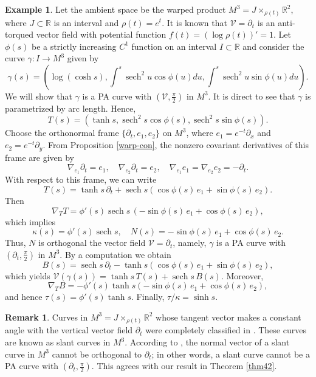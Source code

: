 \documentclass[12pt]{amsart}
\def\r{\mathbb R}
\def\v{\mathcal V}
\DeclareMathOperator{\sech}{sech}
\theoremstyle{definition}
\newtheorem{example}[theorem]{Example}
\newtheorem{remark}[theorem]{Remark}
\begin{document}
\begin{example}
Let the ambient space be the warped product $M^3=J\times_{\rho(t)}\r^2$, where $J\subset \r$ is an interval and $\rho(t)=e^t$. It is known that $\v=\partial_t$ is an anti-torqued vector field with potential function $f(t)=(\log \rho(t))'=1$. Let $\phi(s)$ be a strictly increasing $C^1$ function on an interval $I\subset \r$ and consider the curve $\gamma:I\to M^3$ given by
$$
\gamma(s)=\left ( \log (\cosh s), \int^s \sech^2 u\cos \phi(u) du, \int^s \sech^2 u\sin \phi(u) du\right ).
$$
We will show that $\gamma$ is a PA curve with $(\v,\frac{\pi}{2})$ in $M^3$. It is direct to see that $\gamma$ is parametrized by arc length. Hence,
$$
T(s)=\left ( \tanh s, \sech^2 s\cos \phi(s), \sech^2 s\sin \phi(s)\right ).
$$
Choose the orthonormal frame $\{\partial_t,e_1,e_2\}$ on $M^3$, where $e_1=e^{-t}\partial_x$ and $e_2=e^{-t}\partial_y$. From Proposition \ref{warp-con}, the nonzero covariant derivatives of this frame are given by
$$
\nabla_{e_1}\partial_t=e_1, \quad \nabla_{e_2}\partial_t=e_2, \quad \nabla_{e_1}e_1=\nabla_{e_2}e_2=-\partial_t.
$$
With respect to this frame, we can write
$$
T(s)=\tanh s\, \partial_t + \sech s (\cos \phi(s)\, e_1+\sin \phi(s)\, e_2).
$$
Then
$$
\nabla_TT=\phi'(s)\sech s \, (-\sin \phi(s) \,e_1+\cos \phi(s) \,e_2),
$$
which implies
$$
\kappa(s)=\phi'(s)\sech s, \quad N(s)=-\sin \phi(s) \,e_1+\cos \phi(s) \,e_2.
$$
Thus, $N$ is orthogonal the vector field $\v=\partial_t$, namely, $\gamma$ is a PA curve with $(\partial_t,\frac{\pi}{2})$ in $M^3$. By a computation we obtain
$$
B(s)=\sech s \, \partial_t-\tanh s(\cos \phi(s)\, e_1+\sin \phi(s)\, e_2),
$$
which yields $\v(\gamma(s))=\tanh s\,T(s)+\sech s \, B(s)$. Moreover,
$$
\nabla_TB=-\phi'(s)\tanh s (-\sin \phi(s) \,e_1+\cos \phi(s) \,e_2),
$$
and hence $\tau(s)=\phi'(s)\tanh s $. Finally, $\tau/\kappa=\sinh s$.
\end{example}

\begin{remark}
Curves in $M^3=J\times_{\rho(t)} \r^2$ whose tangent vector makes a constant angle with the vertical vector field $\partial_t$ were completely classified in \cite[Theorem 4.1]{ccra}. These curves are known as slant curves in $M^3$. According to \cite[Proposition 3.3]{ccra}, the normal vector of a slant curve in $M^3$ cannot be orthogonal to $\partial_t$; in other words, a slant curve cannot be a PA curve with $(\partial_t,\frac{\pi}{2})$. This agrees with our result in Theorem \ref{thm42}.
\end{remark}
\end{document}
